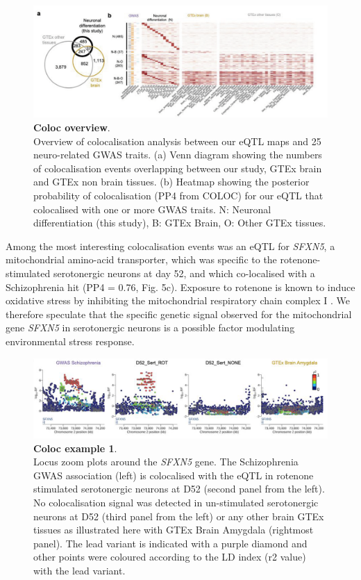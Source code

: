 \begin{figure}[h]
\centering
\includegraphics[width=16cm]{Chapter5/Fig/neuroseq_coloc_overview.png}
\caption[Coloc overview]{\textbf{Coloc overview}.\\
Overview of colocalisation analysis between our eQTL maps and 25 neuro-related GWAS traits. 
(a) Venn diagram showing the numbers of colocalisation events overlapping between our study, GTEx brain and GTEx non brain tissues. 
(b) Heatmap showing the posterior probability of colocalisation (PP4 from COLOC) for our eQTL that colocalised with one or more GWAS traits. 
N: Neuronal differentiation (this study), B: GTEx Brain, O: Other GTEx tissues.}
\label{fig:neuroseq_coloc_overview}
\end{figure}

Among the most interesting colocalisation events was an eQTL for \textit{SFXN5}, a mitochondrial amino-acid transporter, which was specific to the rotenone-stimulated serotonergic neurons at day 52, and which co-localised with a Schizophrenia hit (PP4 = 0.76, Fig. 5c). 
Exposure to rotenone is known to induce oxidative stress by inhibiting the mitochondrial respiratory chain complex I \cite{palmer1968studies, betarbet2000chronic}. 
We therefore speculate that the specific genetic signal observed for the mitochondrial gene \textit{SFXN5} in serotonergic neurons is a possible factor modulating environmental stress response.\\

\begin{figure}[h]
\centering
\includegraphics[width=16cm]{Chapter5/Fig/neuroseq_coloc_example1_SFXN5.png}
\caption[Coloc example 1]{\textbf{Coloc example 1}.\\
Locus zoom plots around the \textit{SFXN5} gene. 
The Schizophrenia GWAS association (left) is colocalised with the eQTL in rotenone stimulated serotonergic neurons at D52 (second panel from the left). 
No colocalisation signal was detected in un-stimulated serotonergic neurons at D52 (third panel from the left) or any other brain GTEx tissues as illustrated here with GTEx Brain Amygdala (rightmost panel). 
The lead variant is indicated with a purple diamond and other points were coloured according to the LD index (r2 value) with the lead variant.}
\label{fig:neuroseq_coloc_example1}
\end{figure}

